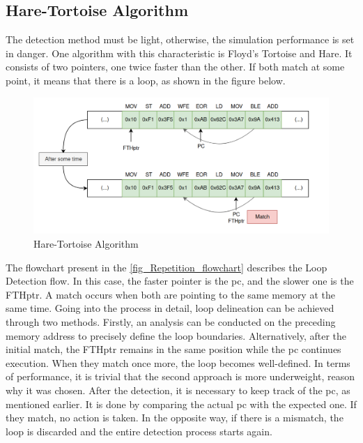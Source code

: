 \subsection{Hare-Tortoise Algorithm}

The detection method must be light, otherwise, the simulation performance is set in danger. One algorithm with this characteristic is Floyd's 
Tortoise and Hare. It consists of two pointers, one twice faster than the other. If both match at some point, it means that there is a 
loop, as shown in the figure below.

\begin{figure}[H]
	\centering
 	\includegraphics[width=0.8\linewidth]{Images/FTH_algorithm.png}
 	\caption{Hare-Tortoise Algorithm}
	 \label{fig_FTH_algorithm}
\end{figure}

The flowchart present in the \autoref{fig_Repetition_flowchart} describes the Loop Detection flow. 
In this case, the faster pointer is the \gls{pc}, and the slower one is the FTHptr. A match occurs when both are pointing to the same memory at 
the same time. Going into the process in detail, loop delineation can be achieved through two methods. Firstly, an analysis can be conducted on 
the preceding memory address to precisely define the loop boundaries. Alternatively, after the initial match, the FTHptr remains in the same position 
while the \gls{pc} continues execution. When they match once more, the loop becomes well-defined. In terms of performance, it is trivial that the 
second approach is more underweight, reason why it was chosen. After the detection, it is necessary to keep track of the \gls{pc}, as mentioned 
earlier. It is done by comparing the actual \gls{pc} with the expected one. If they match, no action is taken. In the opposite way, if there 
is a mismatch, the loop is discarded and the entire detection process starts again.

